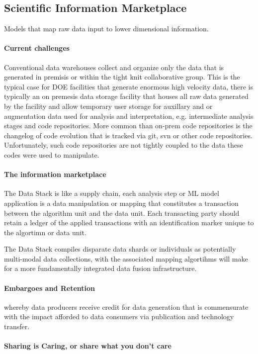 \documentclass{article}
\begin{document}
\subsection{Scientific Information Marketplace}
Models that map raw data input to lower dimensional information. 
\paragraph{Current challenges}
Conventional data warehouses collect and organize only the data that is generated in premisis or within the tight knit collaborative group.
This is the typical case for DOE facilities that generate enormous high velocity data, there is typically an on premesis data storage facility that houses all raw data generated by the facility and allow temporary user storage for auxillary and or augmentation data used for analysis and interpretation, e.g. intermediate analysis stages and code repositories.
More common than on-prem code repositories is the changelog of code evolution that is tracked via git, svn or other code repositories.
Unfortunately, such code repositories are not tightly coupled to the data these codes were used to manipulate.

\paragraph{The information marketplace}
The Data Stack is like a supply chain, each analysis step or ML model application is a data manipulation or mapping that constitutes a transaction between the algorithm unit and the data unit.
Each transacting party should retain a ledger of the applied transactions with an identification marker unique to the algortimn or data unit.


The Data Stack compiles disparate data shards or individuals as potentially multi-modal data collections, with the associated mapping algortihms will make for a more fundamentally integrated data fusion infrastructure.

\paragraph{Embargoes and Retention}
whereby data producers receive credit for data generation that is commensurate with the impact afforded to data consumers via publication and technology transfer.

\paragraph{Sharing is Caring, or share what you don't care}
\end{document}

